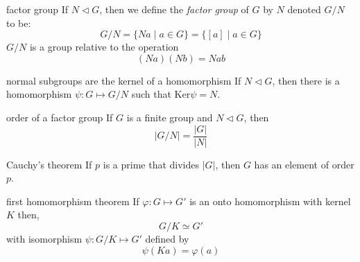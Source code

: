 \documentclass[avery5371,grid]{flashcards}
\begin{document}
\begin{flashcard}{factor group}
If $N \lhd G$, then we define the \textit{factor group}
of $G$ by $N$ denoted $G/N$ to be:
\begin{equation*}
G/N = \lbrace Na \mid a \in G \rbrace = 
\lbrace [a] \mid a \in G \rbrace
\end{equation*}
\medskip
$G/N$ is a group relative to the operation
\begin{equation*}
(Na)(Nb) = Nab
\end{equation*}
\end{flashcard}

\begin{flashcard}[Theorem]{normal subgroups are the kernel of a homomorphism}
If $N \lhd G$, then there is a homomorphism $\psi : G \mapsto G/N$
such that $\textrm{Ker} \psi = N$.
\end{flashcard}

\begin{flashcard}[Theorem]{order of a factor group}
If $G$ is a finite group and $N \lhd G$, then
\begin{equation*}
\left| G/N \right| = \frac{\left| G \right|}{\left| N \right|}
\end{equation*}
\end{flashcard}

\begin{flashcard}[Theorem]{Cauchy's theorem}
If $p$ is a prime that divides $\left| G \right|$,
then $G$ has an element of order $p$.
\end{flashcard}

\begin{flashcard}[Theorem]{first homomorphism theorem}
If $\varphi : G \mapsto G'$ is an onto homomorphism with kernel $K$ then,
\begin{equation*}
G/K \simeq G'
\end{equation*}
with isomorphism $\psi : G/K \mapsto G'$ defined by
\begin{equation*}
\psi (Ka) = \varphi(a)
\end{equation*}
\end{flashcard}
\end{document}
